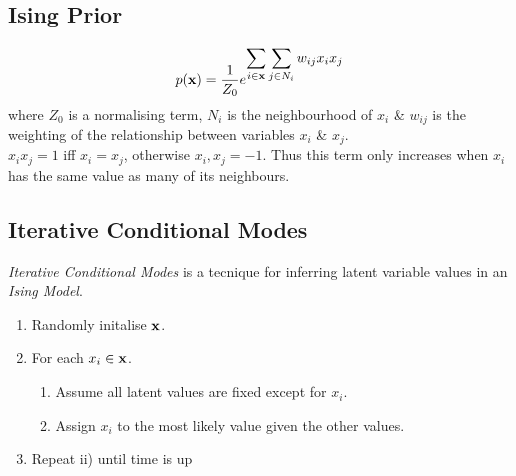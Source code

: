 \documentclass[11pt,a4paper]{article}
\begin{document}
\subsection{Ising Prior}
$$p(\textbf{x})=\frac{1}{Z_0}e^{{\displaystyle\sum_{i\in\textbf{x}}\sum_{j\in N_i}w_{ij}x_ix_j}}$$
where $Z_0$ is a normalising term, $N_i$ is the neighbourhood of $x_i$ \& $w_{ij}$ is the weighting of the relationship between variables $x_i$ \& $x_j$.\\
\nb $x_ix_j=1$ iff $x_i=x_j$, otherwise $x_i,x_j=-1$. Thus this term only increases when $x_i$ has the same value as many of its neighbours.

\subsection{Iterative Conditional Modes}
\textit{Iterative Conditional Modes} is a tecnique for inferring latent variable values in an \textit{Ising Model}.
\begin{enumerate}
	\item Randomly initalise $\textbf{x}$.
	\item For each $x_i\in\textbf{x}$.
	\begin{enumerate}
		\item Assume all latent values are fixed except for $x_i$.
		\item Assign $x_i$ to the most likely value given the other values.
	\end{enumerate}
	\item Repeat ii) until time is up
\end{enumerate}
\end{document}
